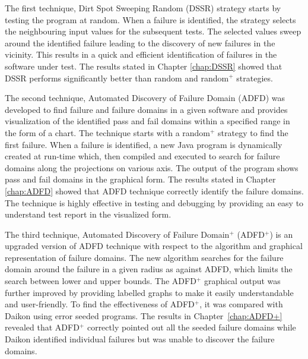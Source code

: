 


The first technique, Dirt Spot Sweeping Random (DSSR) strategy starts by testing the program at random. When a failure is identified, the strategy selects the neighbouring input values for the subsequent tests. The selected values sweep around the identified failure leading to the discovery of new failures in the vicinity. This results in a quick and efficient identification of failures in the software under test. The results stated in Chapter \ref{chap:DSSR} showed that DSSR performs significantly better than random and random$^+$ strategies.

The second technique, Automated Discovery of Failure Domain (ADFD) was developed to find failure and failure domains in a given software and provides visualization of the identified pass and fail domains within a specified range in the form of a chart. The technique starts with a random$^+$ strategy to find the first failure. When a failure is identified, a new Java program is dynamically created at run-time which, then compiled and executed to search for failure domains along the projections on various axis. The output of the program shows pass and fail domains in the graphical form. The results stated in Chapter \ref{chap:ADFD} showed that ADFD technique correctly identify the failure domains. The technique is highly effective in testing and debugging by providing an easy to understand test report in the visualized form. 

The third technique, Automated Discovery of Failure Domain$^+$ (ADFD$^+$) is an upgraded version of ADFD technique with respect to the algorithm and graphical representation of failure domains. The new algorithm searches for the failure domain around the failure in a given radius as against ADFD, which limits the search between lower and upper bounds. The ADFD$^+$ graphical output was further improved by providing labelled graphs to make it easily understandable and user-friendly. To find the effectiveness of ADFD$^+$, it was compared with Daikon using error seeded programs. The results in Chapter~\ref{chap:ADFD+} revealed that ADFD$^+$ correctly pointed out all the seeded failure domains while Daikon identified individual failures but was unable to discover the failure domains. 


